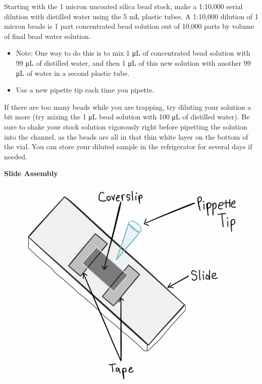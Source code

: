 \documentclass{../lab}
\begin{document}
Starting with the 1 micron uncoated silica bead stock, make a 1:10,000 serial dilution with distilled water using the 5 mL plastic tubes. A 1:10,000 dilution of 1 micron beads is 1 part concentrated bead solution out of 10,000 parts by volume of final bead water solution.

\begin{itemize}
    \item Note: One way to do this is to mix 1 μL of concentrated bead solution with 99 μL of distilled water, and then 1 μL of this new solution with another 99 μL of water in a second plastic tube.

    \item Use a new pipette tip each time you pipette.

\end{itemize}

If there are too many beads while you are trapping, try diluting your solution a bit more (try mixing the 1 μL bead solution with 100 μL of distilled water). Be sure to shake your stock solution vigorously right before pipetting the solution into the channel, as the beads are all in that thin white layer on the bottom of the vial. You can store your diluted sample in the refrigerator for several days if needed.

\textbf{Slide Assembly}


\begin{figure}[h]
    \centering
    \href{http://dev-physicsadv.pantheon.berkeley.edu/sites/default/files/images/OTZSlide.jpg}{\includegraphics[width=0.5\linewidth]{images/OTZSlide.jpg}}
    \caption{}
    \label{fig:OTZSlide}
\end{figure}

​
\end{document}
